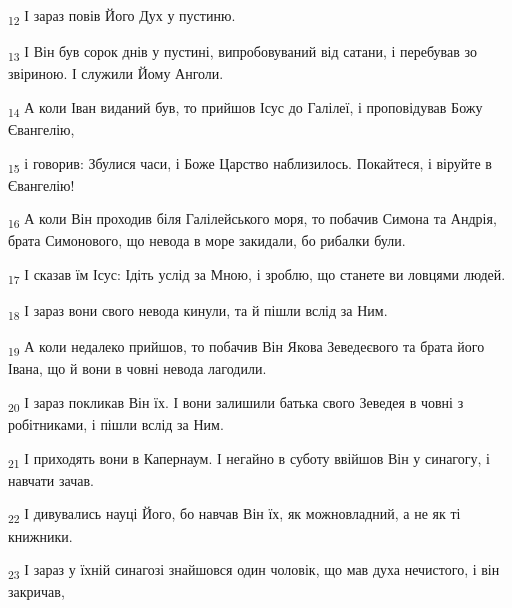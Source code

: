 \begin{tcolorbox}
\textsubscript{12} І зараз повів Його Дух у пустиню.
\end{tcolorbox}
\begin{tcolorbox}
\textsubscript{13} І Він був сорок днів у пустині, випробовуваний від сатани, і перебував зо звіриною. І служили Йому Анголи.
\end{tcolorbox}
\begin{tcolorbox}
\textsubscript{14} А коли Іван виданий був, то прийшов Ісус до Галілеї, і проповідував Божу Євангелію,
\end{tcolorbox}
\begin{tcolorbox}
\textsubscript{15} і говорив: Збулися часи, і Боже Царство наблизилось. Покайтеся, і віруйте в Євангелію!
\end{tcolorbox}
\begin{tcolorbox}
\textsubscript{16} А коли Він проходив біля Галілейського моря, то побачив Симона та Андрія, брата Симонового, що невода в море закидали, бо рибалки були.
\end{tcolorbox}
\begin{tcolorbox}
\textsubscript{17} І сказав їм Ісус: Ідіть услід за Мною, і зроблю, що станете ви ловцями людей.
\end{tcolorbox}
\begin{tcolorbox}
\textsubscript{18} І зараз вони свого невода кинули, та й пішли вслід за Ним.
\end{tcolorbox}
\begin{tcolorbox}
\textsubscript{19} А коли недалеко прийшов, то побачив Він Якова Зеведеєвого та брата його Івана, що й вони в човні невода лагодили.
\end{tcolorbox}
\begin{tcolorbox}
\textsubscript{20} І зараз покликав Він їх. І вони залишили батька свого Зеведея в човні з робітниками, і пішли вслід за Ним.
\end{tcolorbox}
\begin{tcolorbox}
\textsubscript{21} І приходять вони в Капернаум. І негайно в суботу ввійшов Він у синагогу, і навчати зачав.
\end{tcolorbox}
\begin{tcolorbox}
\textsubscript{22} І дивувались науці Його, бо навчав Він їх, як можновладний, а не як ті книжники.
\end{tcolorbox}
\begin{tcolorbox}
\textsubscript{23} І зараз у їхній синагозі знайшовся один чоловік, що мав духа нечистого, і він закричав,
\end{tcolorbox}
